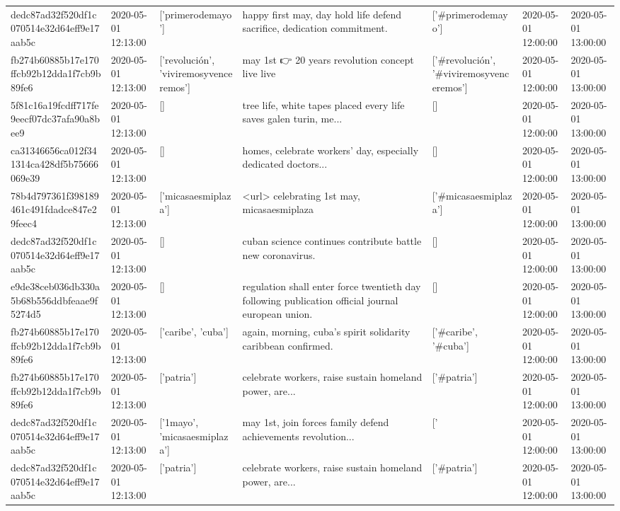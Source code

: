 \begin{tabular}{lllllll}
dedc87ad32f520df1c070514e32d64eff9e17aab5c & 2020-05-01 12:13:00 & ['primerodemayo'] & happy first may, day hold life defend sacrifice, dedication commitment. & ['#primerodemayo'] & 2020-05-01 12:00:00 & 2020-05-01 13:00:00 \\
fb274b60885b17e170ffcb92b12dda1f7cb9b89fe6 & 2020-05-01 12:13:00 & ['revolución', 'viviremosyvenceremos'] & may 1st 👉 20 years revolution concept live live & ['#revolución', '#viviremosyvenceremos'] & 2020-05-01 12:00:00 & 2020-05-01 13:00:00 \\
5f81c16a19fcdff717fe9eecf07dc37afa90a8bee9 & 2020-05-01 12:13:00 & [] & tree life, white tapes placed every life saves galen turin, me... & [] & 2020-05-01 12:00:00 & 2020-05-01 13:00:00 \\
ca31346656ca012f341314ca428df5b75666069e39 & 2020-05-01 12:13:00 & [] & homes, celebrate workers' day, especially dedicated doctors... & [] & 2020-05-01 12:00:00 & 2020-05-01 13:00:00 \\
78b4d797361f398189461c491fdadce847e29feec4 & 2020-05-01 12:13:00 & ['micasaesmiplaza'] & <url> celebrating 1st may, micasaesmiplaza & ['#micasaesmiplaza'] & 2020-05-01 12:00:00 & 2020-05-01 13:00:00 \\
dedc87ad32f520df1c070514e32d64eff9e17aab5c & 2020-05-01 12:13:00 & [] & cuban science continues contribute battle new coronavirus. & [] & 2020-05-01 12:00:00 & 2020-05-01 13:00:00 \\
e9de38ceb036db330a5b68b556ddbfeaae9f5274d5 & 2020-05-01 12:13:00 & [] & regulation shall enter force twentieth day following publication official journal european union. & [] & 2020-05-01 12:00:00 & 2020-05-01 13:00:00 \\
fb274b60885b17e170ffcb92b12dda1f7cb9b89fe6 & 2020-05-01 12:13:00 & ['caribe', 'cuba'] & again, morning, cuba's spirit solidarity caribbean confirmed. & ['#caribe', '#cuba'] & 2020-05-01 12:00:00 & 2020-05-01 13:00:00 \\
fb274b60885b17e170ffcb92b12dda1f7cb9b89fe6 & 2020-05-01 12:13:00 & ['patria'] & celebrate workers, raise sustain homeland power, are... & ['#patria'] & 2020-05-01 12:00:00 & 2020-05-01 13:00:00 \\
dedc87ad32f520df1c070514e32d64eff9e17aab5c & 2020-05-01 12:13:00 & ['1mayo', 'micasaesmiplaza'] & may 1st, join forces family defend achievements revolution... & ['#1mayo', '#micasaesmiplaza'] & 2020-05-01 12:00:00 & 2020-05-01 13:00:00 \\
dedc87ad32f520df1c070514e32d64eff9e17aab5c & 2020-05-01 12:13:00 & ['patria'] & celebrate workers, raise sustain homeland power, are... & ['#patria'] & 2020-05-01 12:00:00 & 2020-05-01 13:00:00 \\

\end{tabular}

